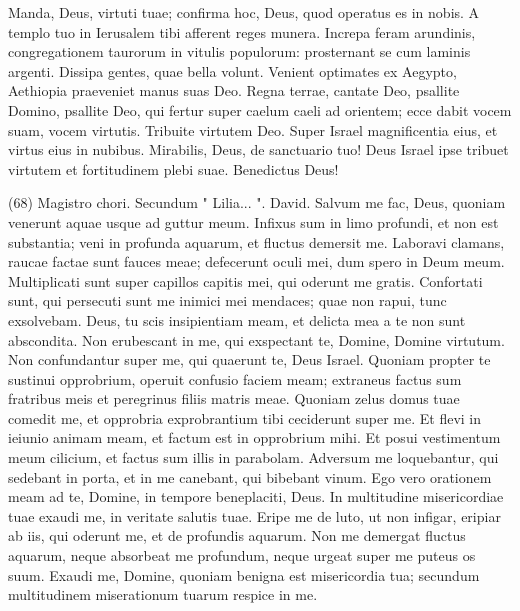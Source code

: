 \begin{biblechapter}
\verse Manda, Deus, virtuti tuae; confirma hoc, Deus, quod operatus es in nobis. 
\verse A templo tuo in Ierusalem tibi afferent reges munera. 
\verse Increpa feram arundinis, congregationem taurorum in vitulis populorum: prosternant se cum laminis argenti. Dissipa gentes, quae bella volunt. 
\verse Venient optimates ex Aegypto, Aethiopia praeveniet manus suas Deo. 
\verse Regna terrae, cantate Deo, psallite Domino, psallite Deo, 
\verse qui fertur super caelum caeli ad orientem; ecce dabit vocem suam, vocem virtutis. 
\verse Tribuite virtutem Deo. Super Israel magnificentia eius, et virtus eius in nubibus. 
\verse Mirabilis, Deus, de sanctuario tuo! Deus Israel ipse tribuet virtutem et fortitudinem plebi suae. Benedictus Deus! 
\end{biblechapter}

\begin{biblechapter}  (68) 
\verse  Magistro chori. Secundum " Lilia... ". David. 
\verse Salvum me fac, Deus, quoniam venerunt aquae usque ad guttur meum. 
\verse Infixus sum in limo profundi, et non est substantia; veni in profunda aquarum, et fluctus demersit me. 
\verse Laboravi clamans, raucae factae sunt fauces meae; defecerunt oculi mei, dum spero in Deum meum. 
\verse Multiplicati sunt super capillos capitis mei, qui oderunt me gratis. Confortati sunt, qui persecuti sunt me inimici mei mendaces; quae non rapui, tunc exsolvebam. 
\verse Deus, tu scis insipientiam meam, et delicta mea a te non sunt abscondita. 
\verse Non erubescant in me, qui exspectant te, Domine, Domine virtutum. Non confundantur super me, qui quaerunt te, Deus Israel. 
\verse Quoniam propter te sustinui opprobrium, operuit confusio faciem meam; 
\verse extraneus factus sum fratribus meis et peregrinus filiis matris meae. 
\verse Quoniam zelus domus tuae comedit me, et opprobria exprobrantium tibi ceciderunt super me. 
\verse Et flevi in ieiunio animam meam, et factum est in opprobrium mihi. 
\verse Et posui vestimentum meum cilicium, et factus sum illis in parabolam. 
\verse Adversum me loquebantur, qui sedebant in porta, et in me canebant, qui bibebant vinum. 
\verse Ego vero orationem meam ad te, Domine, in tempore beneplaciti, Deus. In multitudine misericordiae tuae exaudi me, in veritate salutis tuae. 
\verse Eripe me de luto, ut non infigar, eripiar ab iis, qui oderunt me, et de profundis aquarum. 
\verse Non me demergat fluctus aquarum, neque absorbeat me profundum, neque urgeat super me puteus os suum. 
\verse Exaudi me, Domine, quoniam benigna est misericordia tua; secundum multitudinem miserationum tuarum respice in me. 

\end{biblechapter}
